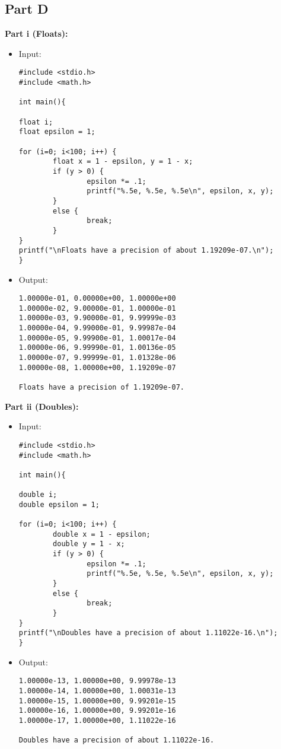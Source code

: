\documentclass[10pt]{article}
\begin{document}
\subsection{Part D}
\textbf{Part i (Floats):}
\begin{itemize}
\item Input:
\begin{verbatim}
#include <stdio.h>
#include <math.h>

int main(){

float i;
float epsilon = 1;

for (i=0; i<100; i++) {
        float x = 1 - epsilon, y = 1 - x;
        if (y > 0) {
                epsilon *= .1;
                printf("%.5e, %.5e, %.5e\n", epsilon, x, y);
        }
        else {
                break;
        }
}
printf("\nFloats have a precision of about 1.19209e-07.\n");
}
\end{verbatim}
\item Output:
\begin{verbatim}
1.00000e-01, 0.00000e+00, 1.00000e+00
1.00000e-02, 9.00000e-01, 1.00000e-01
1.00000e-03, 9.90000e-01, 9.99999e-03
1.00000e-04, 9.99000e-01, 9.99987e-04
1.00000e-05, 9.99900e-01, 1.00017e-04
1.00000e-06, 9.99990e-01, 1.00136e-05
1.00000e-07, 9.99999e-01, 1.01328e-06
1.00000e-08, 1.00000e+00, 1.19209e-07

Floats have a precision of 1.19209e-07.
\end{verbatim}
\end{itemize}
\textbf{Part ii (Doubles):}
\begin{itemize}
\item Input:
\begin{verbatim}
#include <stdio.h>
#include <math.h>

int main(){

double i;
double epsilon = 1;

for (i=0; i<100; i++) {
        double x = 1 - epsilon;
        double y = 1 - x;
        if (y > 0) {
                epsilon *= .1;
                printf("%.5e, %.5e, %.5e\n", epsilon, x, y);
        }
        else {
                break;
        }
}
printf("\nDoubles have a precision of about 1.11022e-16.\n");
}
\end{verbatim}
\item Output:
\begin{verbatim}
1.00000e-13, 1.00000e+00, 9.99978e-13
1.00000e-14, 1.00000e+00, 1.00031e-13
1.00000e-15, 1.00000e+00, 9.99201e-15
1.00000e-16, 1.00000e+00, 9.99201e-16
1.00000e-17, 1.00000e+00, 1.11022e-16

Doubles have a precision of about 1.11022e-16.
\end{verbatim}

\end{itemize}
\end{document}
